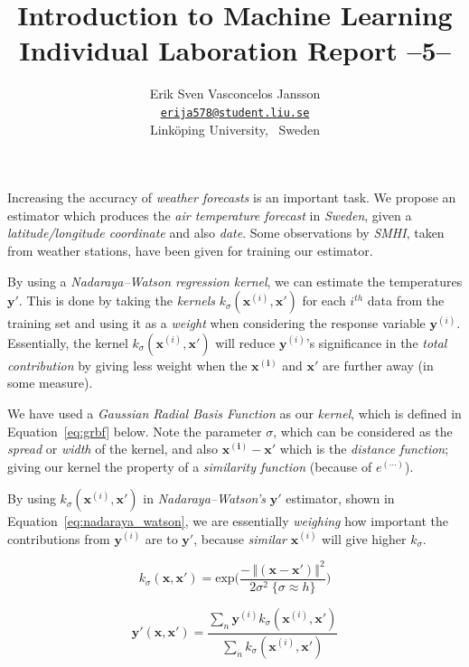 \documentclass[a4paper, twocolumn]{article}
\title{Introduction to Machine Learning \\
       Individual Laboration Report --5--}
\author{{Erik Sven Vasconcelos Jansson} \\
        {\href{mailto:erija578@student.liu.se}
        {\texttt{erija578@student.liu.se}}} \\
        {Linköping University, \, Sweden}}
\begin{document}
    \maketitle %

    Increasing the accuracy of \emph{weather forecasts} is an important task. We propose an estimator which produces the \emph{air temperature forecast} in \emph{Sweden}, given a \emph{latitude/longitude coordinate} and also \emph{date}. Some observations by \emph{SMHI}, taken from weather stations, have been given for training our estimator.

    By using a \emph{Nadaraya–Watson regression kernel}, we can estimate the temperatures \(\bm{y'}\). This is done by taking the \emph{kernels} \(k_\sigma(\bm{x}^{(i)}, \bm{x'})\) for each \(i^{th}\) data from the training set and using it as a \emph{weight} when considering the response variable \(\bm{y}^{(i)}\). Essentially, the kernel \(k_\sigma(\bm{x}^{(i)}, \bm{x'})\) will reduce \(\bm{y}^{(i)}\)'s significance in the \emph{total contribution} by giving less weight when the \(\bm{x^{(i)}}\) and \(\bm{x'}\) are further away (in some measure).

    We have used a \emph{Gaussian Radial Basis Function} as our \emph{kernel}, which is defined in Equation~\ref{eq:grbf} below. Note the parameter \(\sigma\), which can be considered as the \emph{spread} or \emph{width} of the kernel, and also \(\bm{x^{(i)}} - \bm{x'}\) which is the \emph{distance function}; giving our kernel the property of a \emph{similarity function} (because of \(e^{(\cdots)}\)).

    By using \(k_\sigma(\bm{x}^{(i)}, \bm{x'})\) in \emph{Nadaraya–Watson's} \(\bm{y'}\) estimator, shown in Equation~\ref{eq:nadaraya_watson}, we are essentially \emph{weighing} how important the contributions from \(\bm{y}^{(i)}\) are to \(\bm{y'}\), because \emph{similar} \(\bm{x}^{(i)}\) will give higher \(k_\sigma\).

    \begin{equation} \label{eq:grbf}
        k_\sigma(\bm{x}, \bm{x'}) = \mathrm{exp}\bigg(\frac{- \, {\left\Vert(\bm{x} - \bm{x'}) \right\Vert}^2}
                                                           {2\sigma^2 \; \{\sigma \approx h\}}\bigg)
    \end{equation}

    \begin{equation} \label{eq:nadaraya_watson}
        \bm{y'}(\bm{x}, \bm{x'}) = \frac{\sum_n{\bm{y}^{(i)}k_\sigma(\bm{x}^{(i)}, \bm{x'})}}
                                               {\sum_n{k_\sigma(\bm{x}^{(i)}, \bm{x'})}}
    \end{equation}
\end{document}
